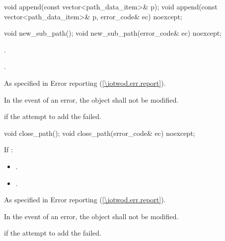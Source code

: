 \begin{itemdecl}
    void append(const vector<path_data_item>& p);
    void append(const vector<path_data_item>& p, error_code& ec) noexcept;
\end{itemdecl}
\begin{itemdescr}
	\pnum
	\postconditions
	
\end{itemdescr}

\begin{itemdecl}
    void new_sub_path();
    void new_sub_path(error_code& ec) noexcept;
\end{itemdecl}
\begin{itemdescr}
	\pnum
	\effects
	.
	
	\pnum
	.
	
	\pnum
	\throws
	As specified in Error reporting (\ref{\iotwod.err.report}).

	\pnum
	\remarks
	In the event of an error, the object shall not be modified.

	\pnum
	\errors
	 if the attempt to add the  failed.
	
\end{itemdescr}

\begin{itemdecl}
    void close_path();
    void close_path(error_code& ec) noexcept;
\end{itemdecl}
\begin{itemdescr}
	\pnum
	\effects
	If :
	\begin{itemize}
	\item {}.
	
	\item {}.
	\end{itemize}
	
	\pnum
	\throws
	As specified in Error reporting (\ref{\iotwod.err.report}).

	\pnum
	\remarks
	In the event of an error, the object shall not be modified.

	\pnum
	\errors
	 if the attempt to add the  failed.
	
\end{itemdescr}

